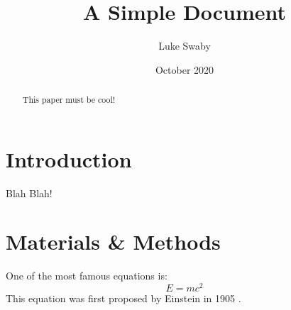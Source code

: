 \documentclass[12pt]{article}
\title{A Simple Document}
\author{Luke Swaby}
\date{October 2020}
\begin{document}
	\maketitle
  
	\begin{abstract}
	This paper must be cool!
	\end{abstract}
  
	\section{Introduction}
	Blah Blah!
  
	\section{Materials \& Methods}
	One of the most famous equations is:
	\begin{equation}
	E = mc^2
	\end{equation}
	This equation was first proposed by Einstein in 1905 
	\cite{einstein1905does}.
  
	
	
\end{document}
